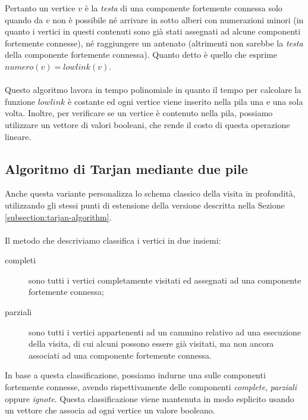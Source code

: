 Pertanto un vertice $v$ \`e la \emph{testa} di una componente
fortemente connessa solo quando da $v$ non \`e possibile n\'e arrivare
in sotto alberi con numerazioni minori (in quanto i vertici in questi
contenuti sono gi\`a stati assegnati ad alcune componenti fortemente
connesse), n\'e raggiungere un antenato (altrimenti non sarebbe la
\emph{testa} della componente fortemente connessa). Quanto detto \`e
quello che esprime $numero(v) = lowlink(v)$.
\\\\
Questo algoritmo lavora in tempo polinomiale in quanto il tempo per
calcolare la funzione $lowlink$ \`e costante ed ogni vertice viene
inserito nella pila una e una sola volta. Inoltre, per verificare se
un vertice \`e contenuto nella pila, possiamo utilizzare un vettore di
valori booleani, che rende il costo di questa operazione lineare.

\subsection{Algoritmo di Tarjan mediante due pile}
\label{subsection:crescenzi-gambosi-grossi}
Anche questa variante personalizza lo schema classico della visita in
profondit\`a, utilizzando gli stessi punti di estensione della
versione descritta nella Sezione \ref{subsection:tarjan-algorithm}.
\\\\
Il metodo che descriviamo classifica i vertici in due insiemi:
\begin{description}
\item[completi] sono tutti i vertici completamente visitati ed
  assegnati ad una componente fortemente connessa;
\item[parziali] sono tutti i vertici appartenenti ad un cammino
  relativo ad una esecuzione della visita, di cui alcuni possono
  essere gi\`a visitati, ma non ancora associati ad una componente
  fortemente connessa.
\end{description}
In base a questa classificazione, possiamo indurne una sulle
componenti fortemente connesse, avendo rispettivamente delle
componenti \emph{complete}, \emph{parziali} oppure
\emph{ignote}. Questa classificazione viene mantenuta in modo
esplicito usando un vettore che associa ad ogni vertice un valore
booleano.

